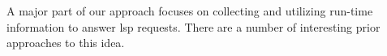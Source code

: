 \documentclass[sigplan,10pt,review,anonymous]{acmart}
\begin{document}



A major part of our approach focuses on collecting and utilizing run-time
information to answer \ac{lsp}
requests. %
There are a number of interesting prior approaches to this idea.
\end{document}
